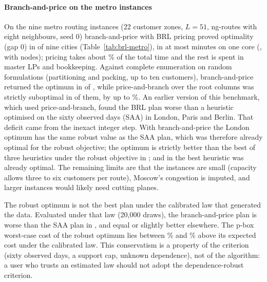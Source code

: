 \documentclass[preprint,12pt]{elsarticle}
\theoremstyle{definition}
\theoremstyle{remark}
\begin{document}
\begin{table}[t]\centering\small
\caption{BRL pricing on random instances (nine sectors, $L=33$ levels, capacity 6, two instances per size). Time in seconds (labels kept); TO: 60\,s limit. The risk-neutral labelling solves a different (expected-value) problem and is shown for reference; SAA scenarios optimise the sample-average objective.}\label{tab:brl-pricing}
\end{table}

\paragraph{Branch-and-price on the metro instances} On the nine metro routing instances (22 customer zones, $L=51$, ng-routes with eight neighbours, seed 0) branch-and-price with BRL pricing proved optimality (gap 0) in \BPoptimalN{} of nine cities (Table~\ref{tab:brl-metro}), in at most \BPtimeMaxMin{} minutes on one core (\BPtimeMaxCity, with \BPnodesMax{} nodes); pricing takes about \BPpricingShare\% of the total time and the rest is spent in master LPs and bookkeeping. Against complete enumeration on \BPverN{} random formulations (partitioning and packing, up to ten customers), branch-and-price returned the optimum in \BPverExact{} of \BPverN, while price-and-branch over the root columns was strictly suboptimal in \BPverPBsub{} of them, by up to \BPverPBmax\%. An earlier version of this benchmark, which used price-and-branch, found the BRL plan worse than a heuristic optimised on the sixty observed days (SAA) in London, Paris and Berlin. That deficit came from the inexact integer step. With branch-and-price the London optimum has the same robust value as the SAA plan, which was therefore already optimal for the robust objective; the optimum is strictly better than the best of three heuristics under the robust objective in \BPbetterCities; and in \BPequalCities{} the best heuristic was already optimal. The remaining limits are that the instances are small (capacity allows three to six customers per route), Moscow's congestion is imputed, and larger instances would likely need cutting planes.

The robust optimum is not the best plan under the calibrated law that generated the data. Evaluated under that law (20{,}000 draws), the branch-and-price plan is worse than the SAA plan in \BPtrueWorse, and equal or slightly better elsewhere. The p-box worst-case cost of the robust optimum lies between \BPconsMin\% and \BPconsMax\% above its expected cost under the calibrated law. This conservatism is a property of the criterion (sixty observed days, a support cap, unknown dependence), not of the algorithm: a user who trusts an estimated law should not adopt the dependence-robust criterion.
\end{document}

